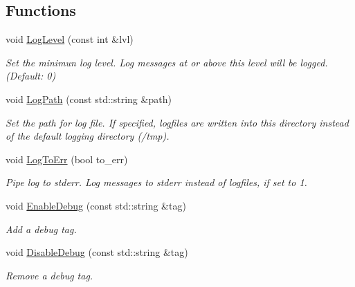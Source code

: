 \subsection*{Functions}
\begin{DoxyCompactItemize}
\item 
void \mbox{\hyperlink{namespaceilang_a38808a9aed62a8c4a6917621c9318d6e}{Log\+Level}} (const int \&lvl)
\begin{DoxyCompactList}\small\item\em Set the minimun log level. Log messages at or above this level will be logged. (Default\+: 0) \end{DoxyCompactList}\item 
\mbox{\label{namespaceilang_a04b0d31076d694adcb6b1ee0a475c9dd}} 
void \mbox{\hyperlink{namespaceilang_a04b0d31076d694adcb6b1ee0a475c9dd}{Log\+Path}} (const std\+::string \&path)
\begin{DoxyCompactList}\small\item\em Set the path for log file. If specified, logfiles are written into this directory instead of the default logging directory (/tmp). \end{DoxyCompactList}\item 
\mbox{\label{namespaceilang_a7d33dbd65f2036041b06be22c830592b}} 
void \mbox{\hyperlink{namespaceilang_a7d33dbd65f2036041b06be22c830592b}{Log\+To\+Err}} (bool to\+\_\+err)
\begin{DoxyCompactList}\small\item\em Pipe log to stderr. Log messages to stderr instead of logfiles, if set to 1. \end{DoxyCompactList}\item 
\mbox{\label{namespaceilang_af596c444f0d40287ee7b91263d6ab91c}} 
void \mbox{\hyperlink{namespaceilang_af596c444f0d40287ee7b91263d6ab91c}{Enable\+Debug}} (const std\+::string \&tag)
\begin{DoxyCompactList}\small\item\em Add a debug tag. \end{DoxyCompactList}\item 
\mbox{\label{namespaceilang_a7b96e3e4622bcefd2d1159766a2df3d8}} 
void \mbox{\hyperlink{namespaceilang_a7b96e3e4622bcefd2d1159766a2df3d8}{Disable\+Debug}} (const std\+::string \&tag)
\begin{DoxyCompactList}\small\item\em Remove a debug tag. \end{DoxyCompactList}\item 

\end{DoxyCompactItemize}
